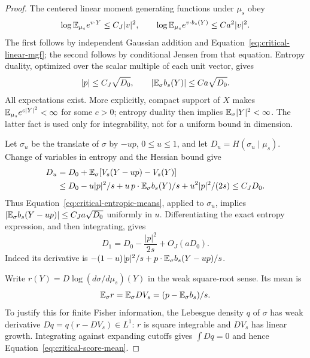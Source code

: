\begin{proof}
The centered linear moment generating functions under $\mu_s$
obey
\[
 \log\mathbb E_{\mu_s}e^{v\cdot Y}\le C_J|v|^2,
 \qquad
 \log\mathbb E_{\mu_s}e^{v\cdot b_s(Y)}\le Ca^2|v|^2.
\]
The first follows by independent Gaussian addition and
Equation~\eqref{eq:critical-linear-mgf}; the second follows by
conditional Jensen from that equation. Entropy duality, optimized
over the scalar multiple of each unit vector, gives
\begin{equation}\label{eq:critical-entropic-means}
 |p|\le C_J\sqrt{D_0},\qquad
 |\mathbb E_\sigma b_s(Y)|\le Ca\sqrt{D_0}.
\end{equation}
All expectations exist. More explicitly, compact support of $X$
makes $\mathbb E_{\mu_s}e^{c|Y|^2}<\infty$ for some $c>0$;
entropy duality then implies $\mathbb E_\sigma|Y|^2<\infty$.
The latter fact is used only for integrability, not for a uniform
bound in dimension.

Let $\sigma_u$ be the translate of $\sigma$ by $-up$,
$0\le u\le1$, and let $D_u=H(\sigma_u\mid\mu_s)$.
Change of variables in entropy and the Hessian bound give
\begin{align*}
 D_u
 &=D_0+\mathbb E_\sigma[V_s(Y-up)-V_s(Y)]\\
 &\le D_0-u|p|^2/s+u\,p\cdot\mathbb E_\sigma b_s(Y)/s
                                +u^2|p|^2/(2s)
 \le C_JD_0.
\end{align*}
Thus Equation~\eqref{eq:critical-entropic-means}, applied to
$\sigma_u$, implies
$|\mathbb E_\sigma b_s(Y-up)|\le C_Ja\sqrt{D_0}$ uniformly in $u$.
Differentiating the exact entropy expression, and then integrating,
gives
\begin{equation}\label{eq:critical-translated-entropy}
 D_1=D_0-\frac{|p|^2}{2s}+O_J(aD_0).
\end{equation}
Indeed its derivative is
$-(1-u)|p|^2/s+p\cdot\mathbb E_\sigma b_s(Y-up)/s$.

Write $r(Y)=D\log(d\sigma/d\mu_s)(Y)$ in the weak
square-root sense. Its mean is
\begin{equation}\label{eq:critical-score-mean}
 \mathbb E_\sigma r=\mathbb E_\sigma DV_s=(p-\mathbb E_\sigma b_s)/s.
\end{equation}
To justify this for finite Fisher information, the Lebesgue density
$q$ of $\sigma$ has weak derivative
$Dq=q(r-DV_s)\in L^1$: $r$ is square integrable and $DV_s$
has linear growth. Integrating against expanding cutoffs gives
$\int Dq=0$ and hence Equation~\eqref{eq:critical-score-mean}.


\end{proof}
